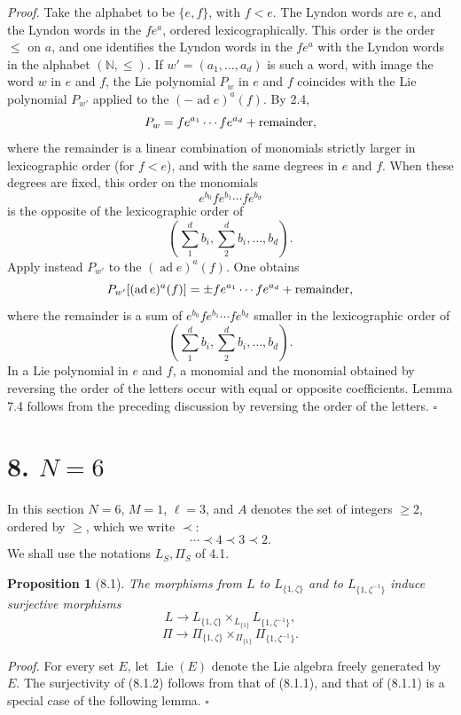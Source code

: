 \documentclass[10pt,a4paper]{article}
\newcommand{\Lie}{\operatorname{Lie}}
\newcommand{\ad}{\operatorname{ad}}
\theoremstyle{deligne}
\newtheorem*{proposition*}{Proposition}
\newenvironment{proofdel}{\textit{Proof.}}{\hfill$\square$}
\begin{document}
\begin{proofdel}
Take the alphabet to be \(\{e,f\}\), with \(f<e\). The Lyndon words are \(e\), and the Lyndon words in the \(fe^a\), ordered lexicographically. This order is the order \(\le\) on \(a\), and one identifies the Lyndon words in the \(fe^a\) with the Lyndon words in the alphabet \((\mathbb N,\le)\). If \(w'=(a_1,\ldots,a_d)\) is such a word, with image the word \(w\) in \(e\) and \(f\), the Lie polynomial \(P_w\) in \(e\) and \(f\) coincides with the Lie polynomial \(P_{w'}\) applied to the \((-\ad e)^a(f)\). By 2.4,
\[
P_w=fe^{a_1}\cdots fe^{a_d}+\hbox{remainder},
\]
where the remainder is a linear combination of monomials strictly larger in lexicographic order (for \(f<e\)), and with the same degrees in \(e\) and \(f\). When these degrees are fixed, this order on the monomials
\[
e^{b_0}fe^{b_1}\cdots fe^{b_d}
\]
is the opposite of the lexicographic order of
\[
\left(\sum_1^d b_i,\sum_2^d b_i,\ldots,b_d\right).
\]
Apply instead \(P_{w'}\) to the \((\ad e)^a(f)\). One obtains
\[
P_{w'}[(\ad e)^a(f)]=\pm fe^{a_1}\cdots fe^{a_d}+\hbox{remainder},
\]
where the remainder is a sum of \(e^{b_0}fe^{b_1}\cdots fe^{b_d}\) smaller in the lexicographic order of
\[
\left(\sum_1^d b_i,\sum_2^d b_i,\ldots,b_d\right).
\]
In a Lie polynomial in \(e\) and \(f\), a monomial and the monomial obtained by reversing the order of the letters occur with equal or opposite coefficients. Lemma 7.4 follows from the preceding discussion by reversing the order of the letters.
\end{proofdel}

\section*{8. \(N=6\)}

In this section \(N=6\), \(M=1\), \(\ell=3\), and \(A\) denotes the set of integers \(\ge2\), ordered by \(\ge\), which we write \(\prec\):
\[
\cdots\prec4\prec3\prec2.
\]
We shall use the notations \(L_S,\Pi_S\) of 4.1.

\begin{proposition*}[8.1]
The morphisms from \(L\) to \(L_{\{1,\zeta\}}\) and to \(L_{\{1,\zeta^{-1}\}}\) induce surjective morphisms
\[
\tag{8.1.1}
L\longrightarrow L_{\{1,\zeta\}}\times_{L_{\{1\}}}L_{\{1,\zeta^{-1}\}},
\]
\[
\tag{8.1.2}
\Pi\longrightarrow \Pi_{\{1,\zeta\}}\times_{\Pi_{\{1\}}}\Pi_{\{1,\zeta^{-1}\}}.
\]
\end{proposition*}

\begin{proofdel}
For every set \(E\), let \(\Lie(E)\) denote the Lie algebra freely generated by \(E\). The surjectivity of (8.1.2) follows from that of (8.1.1), and that of (8.1.1) is a special case of the following lemma.
\end{proofdel}
\end{document}
